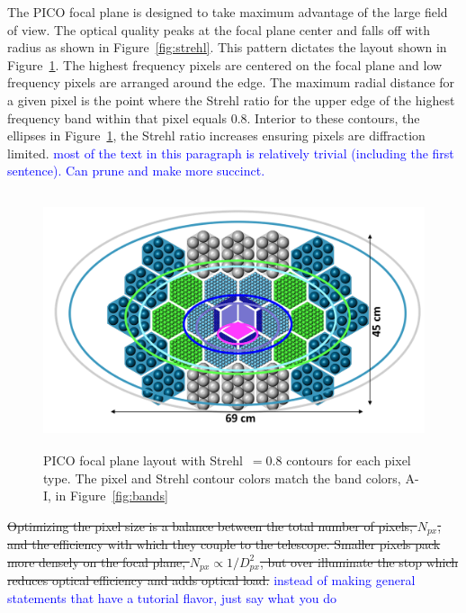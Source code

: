 \documentclass[]{spie}  %
\newcommand{\comb}[1]{\textcolor{blue}{#1}}
\begin{document}
The PICO focal plane is designed to take maximum advantage of the large field of view.  The optical quality peaks at the 
focal plane center and falls off with radius as shown in Figure~\ref{fig:strehl}.  This pattern dictates the layout shown 
in Figure~\ref{fig:focal_plane}. The highest frequency pixels are centered on the focal plane and low frequency pixels are arranged 
around the edge. The maximum radial distance for a given pixel is the point where 
the Strehl ratio for the upper edge of the highest frequency band within that pixel equals 0.8.  Interior to these contours, the ellipses in 
Figure~\ref{fig:focal_plane}, the Strehl ratio increases ensuring pixels are diffraction limited.
\comb{most of the text in this paragraph is relatively trivial (including the first sentence). Can prune and make more succinct.}

\begin{figure} [ht]
\begin{center}
\includegraphics[height=7.5cm]{version3_focal_plane.png}
\end{center}
\caption { \label{fig:focal_plane} 
PICO focal plane layout with Strehl~$=0.8$ contours for each pixel type. The pixel and Strehl contour colors match the band colors, A-I, 
in Figure~\ref{fig:bands} }
\end{figure} 

\sout{Optimizing the pixel size is a balance between the total number of pixels, $N_{px}$, and the efficiency with which 
they couple to the telescope. Smaller pixels pack more densely on the focal plane, $N_{px}\propto 1/D_{px}^2$, but over 
illuminate the stop which reduces optical efficiency and adds optical load.}  \comb{instead of making general statements
that have a tutorial flavor, just say what you do}
\end{document}
